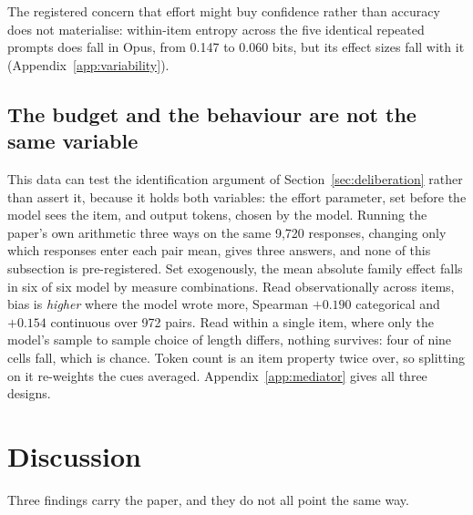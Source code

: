 \ifsubmission\else\fi

\ifsubmission\else\fi

\ifsubmission
The registered concern that effort might buy confidence rather than accuracy
does not materialise: within-item entropy across the five identical repeated
prompts does fall in Opus, from 0.147 to 0.060 bits, but its effect sizes
fall with it (Appendix~\ref{app:variability}).
\else

\fi

\subsection{The budget and the behaviour are not the same variable}
\label{sec:lengthorlabel}
\label{sec:mediator}
\ifsubmission
This data can test the identification argument of
Section~\ref{sec:deliberation} rather than assert it, because it holds both
variables: the effort parameter, set before the model sees the item, and
output tokens, chosen by the model. Running the paper's own arithmetic three
ways on the same 9{,}720 responses, changing only which responses enter each
pair mean, gives three answers, and none of this subsection is
pre-registered. Set exogenously, the mean absolute family effect falls in six
of six model by measure combinations. Read observationally across items, bias
is \textit{higher} where the model wrote more, Spearman $+0.190$ categorical
and $+0.154$ continuous over 972 pairs. Read within a single item, where only
the model's sample to sample choice of length differs, nothing survives: four
of nine cells fall, which is chance. Token count is an item property twice
over, so splitting on it re-weights the cues averaged.
Appendix~\ref{app:mediator} gives all three designs.
\else

\fi

\ifsubmission\else\fi

\section{Discussion}
Three findings carry the paper, and they do not all point the same way.

